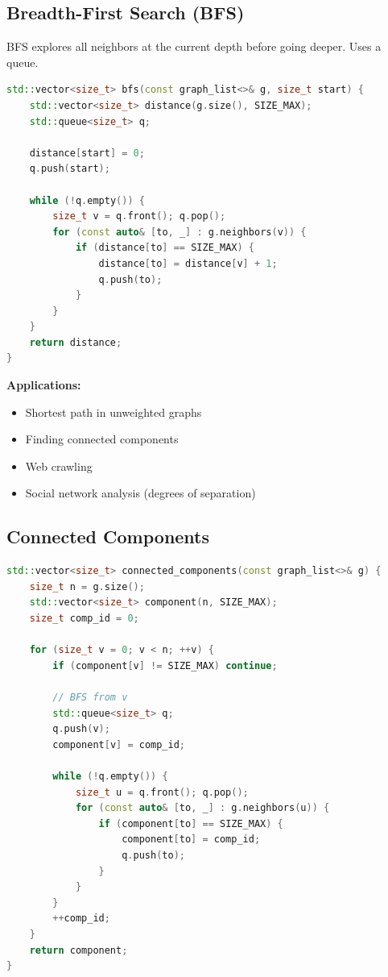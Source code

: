 \subsection{Breadth-First Search (BFS)}

BFS explores all neighbors at the current depth before going deeper. Uses a queue.

\begin{lstlisting}[language=C++]
std::vector<size_t> bfs(const graph_list<>& g, size_t start) {
    std::vector<size_t> distance(g.size(), SIZE_MAX);
    std::queue<size_t> q;
    
    distance[start] = 0;
    q.push(start);
    
    while (!q.empty()) {
        size_t v = q.front(); q.pop();
        for (const auto& [to, _] : g.neighbors(v)) {
            if (distance[to] == SIZE_MAX) {
                distance[to] = distance[v] + 1;
                q.push(to);
            }
        }
    }
    return distance;
}
\end{lstlisting}

\textbf{Applications:}
\begin{itemize}
\item Shortest path in unweighted graphs
\item Finding connected components
\item Web crawling
\item Social network analysis (degrees of separation)
\end{itemize}

\subsection{Connected Components}

\begin{lstlisting}[language=C++]
std::vector<size_t> connected_components(const graph_list<>& g) {
    size_t n = g.size();
    std::vector<size_t> component(n, SIZE_MAX);
    size_t comp_id = 0;

    for (size_t v = 0; v < n; ++v) {
        if (component[v] != SIZE_MAX) continue;
        
        // BFS from v
        std::queue<size_t> q;
        q.push(v);
        component[v] = comp_id;
        
        while (!q.empty()) {
            size_t u = q.front(); q.pop();
            for (const auto& [to, _] : g.neighbors(u)) {
                if (component[to] == SIZE_MAX) {
                    component[to] = comp_id;
                    q.push(to);
                }
            }
        }
        ++comp_id;
    }
    return component;
}
\end{lstlisting}


